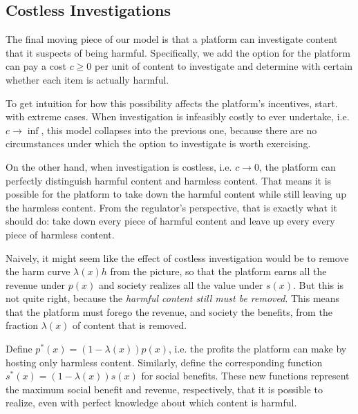 \subsection{Costless Investigations}
\label{sec:costless}

The final moving piece of our model is that a platform can investigate content that it suspects of being harmful. Specifically, we add the option for the platform can pay a cost $c \ge 0$  per unit of content to investigate and determine with certain whether each item is actually harmful.

To get intuition for how this possibility affects the platform's incentives, start. with extreme cases. When investigation is infeasibly costly to ever undertake, i.e. $c \to \inf$, this model collapses into the previous one, because there are no circumstances under which the option to investigate is worth exercising.

On the other hand, when investigation is costless, i.e. $c \to 0$, the platform can perfectly distinguish harmful content and harmless content. That means it is possible for the platform to take down the harmful content while still leaving up the harmless content. From the regulator's perspective, that is exactly what it should do: take down every piece of harmful content and leave up every every piece of harmless content. 

Naively, it might seem like the effect of costless investigation would be to remove the harm curve $\lambda(x)h$ from the picture, so that the platform earns all the revenue under $p(x)$ and society realizes all the value under $s(x)$. But this is not quite right, because the \emph{harmful content still must be removed}. This means that the platform must forego the revenue, and society the benefits, from the fraction $\lambda(x)$ of content that is removed.

Define $p^*(x) = (1 - \lambda(x)) p(x)$, i.e. the profits the platform can make by hosting only harmless content. Similarly, define the corresponding function $s^*(x) = (1 - \lambda(x))s(x)$ for social benefits. These new functions represent the maximum social benefit and revenue, respectively, that it is possible to realize, even with perfect knowledge about which content is harmful.

